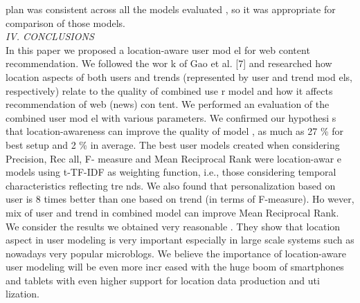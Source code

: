 \documentclass[conference]{IEEEtran}
\begin{document}
plan was consistent across all the models evaluated
, so it was 
appropriate for comparison of those models.\\
\textit{IV.   CONCLUSIONS}
\\
In  this  paper  we  proposed  a  location-aware  user  mod
el 
for  web  content  recommendation.  We  followed  the  wor
k  of 
Gao  et  al.  [7]  and  researched  how  location  aspects 
of  both 
users  and  trends  (represented  by  user  and  trend  mod
els, 
respectively)  relate  to  the  quality  of  combined  use
r  model 
and how it affects recommendation of web (news) con
tent. 
We performed an evaluation of the combined user mod
el 
with  various  parameters.  We  confirmed  our  hypothesi
s  that 
location-awareness  can  improve  the  quality  of  model
,  as 
much  as  27  \%  for  best  setup  and  2  \%  in  average.  The
  best 
user  models  created  when  considering  Precision,  Rec
all,  F-
measure  and  Mean  Reciprocal  Rank  were  location-awar
e 
models  using  t-TF-IDF  as  weighting  function,  i.e., 
those 
considering  temporal  characteristics  reflecting  tre
nds.  We 
also found that personalization based on user is 8 
times better  
than  one  based  on  trend  (in  terms  of  F-measure).  Ho
wever, 
mix of user and trend in combined model can improve
 Mean 
Reciprocal Rank. 
We  consider  the  results  we  obtained  very  reasonable
. 
They  show  that  location  aspect  in  user  modeling  is 
very 
important especially in large scale systems such as
 nowadays 
very  popular  microblogs.  We  believe  the  importance 
of 
location-aware  user  modeling  will  be  even  more  incr
eased 
with  the  huge  boom  of  smartphones  and  tablets  with 
even 
higher support for location data production and uti
lization. 
\end{document}
